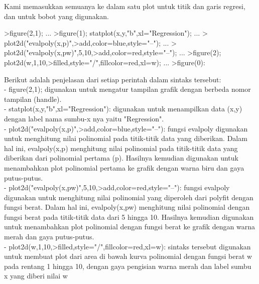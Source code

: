 \documentclass[a4paper,10pt]{article}
\begin{document}
\begin{eulernotebook}
\begin{eulercomment}
\begin{eulercomment}
\begin{eulercomment}
\begin{eulercomment}
\begin{eulercomment}
\begin{eulercomment}
\begin{eulercomment}
\begin{eulercomment}
\begin{eulercomment}
\begin{eulercomment}
\begin{eulercomment}
\begin{eulercomment}
\begin{eulercomment}
\begin{eulercomment}
\begin{eulercomment}
\begin{eulercomment}
\begin{eulercomment}
\begin{eulercomment}
\begin{eulercomment}
Kami memasukkan semuanya ke dalam satu plot untuk titik dan garis
regresi, dan untuk bobot yang digunakan.
\end{eulercomment}
\begin{eulerprompt}
>figure(2,1);  ...
>figure(1); statplot(x,y,"b",xl="Regression"); ...
>  plot2d("evalpoly(x,p)",>add,color=blue,style="--"); ...
>  plot2d("evalpoly(x,pw)",5,10,>add,color=red,style="--"); ...
>figure(2); plot2d(w,1,10,>filled,style="/",fillcolor=red,xl=w); ...
>figure(0):
\end{eulerprompt}
\begin{eulercomment}
Berikut adalah penjelasan dari setiap perintah dalam sintaks tersebut:\\
- figure(2,1); digunakan untuk mengatur tampilan grafik dengan berbeda
nomor tampilan (handle).\\
- statplot(x,y,"b",xl="Regression"): digunakan untuk menampilkan data
(x,y) dengan label nama sumbu-x nya yaitu "Regression".\\
- plot2d("evalpoly(x,p)",\textgreater{}add,color=blue,style="--"): fungsi evalpoly
digunakan untuk menghitung nilai polinomial pada titik-titik data yang
diberikan. Dalam hal ini, evalpoly(x,p) menghitung nilai polinomial
pada titik-titik data yang diberikan dari polinomial pertama (p).
Hasilnya kemudian digunakan untuk menambahkan plot polinomial pertama
ke grafik dengan warna biru dan gaya putus-putus.\\
- plot2d("evalpoly(x,pw)",5,10,\textgreater{}add,color=red,style="--"): fungsi
evalpoly digunakan untuk menghitung nilai polinomial yang diperoleh
dari polyfit dengan fungsi berat. Dalam hal ini, evalpoly(x,pw)
menghitung nilai polinomial dengan fungsi berat pada titik-titik data
dari 5 hingga 10. Hasilnya kemudian digunakan untuk menambahkan plot
polinomial dengan fungsi berat ke grafik dengan warna merah dan gaya
putus-putus.\\
- plot2d(w,1,10,\textgreater{}filled,style="/",fillcolor=red,xl=w): sintaks
tersebut  digunakan untuk membuat plot dari area di bawah kurva
polinomial dengan fungsi berat w pada rentang 1 hingga 10, dengan gaya
pengisian warna merah dan label sumbu x yang diberi nilai w
\end{eulercomment}
\begin{eulercomment}


\end{eulercomment}
\end{eulercomment}
\end{eulercomment}
\end{eulercomment}
\end{eulercomment}
\end{eulercomment}
\end{eulercomment}
\end{eulercomment}
\end{eulercomment}
\end{eulercomment}
\end{eulercomment}
\end{eulercomment}
\end{eulercomment}
\end{eulercomment}
\end{eulercomment}
\end{eulercomment}
\end{eulercomment}
\end{eulercomment}
\end{eulercomment}
\end{eulernotebook}
\end{document}
